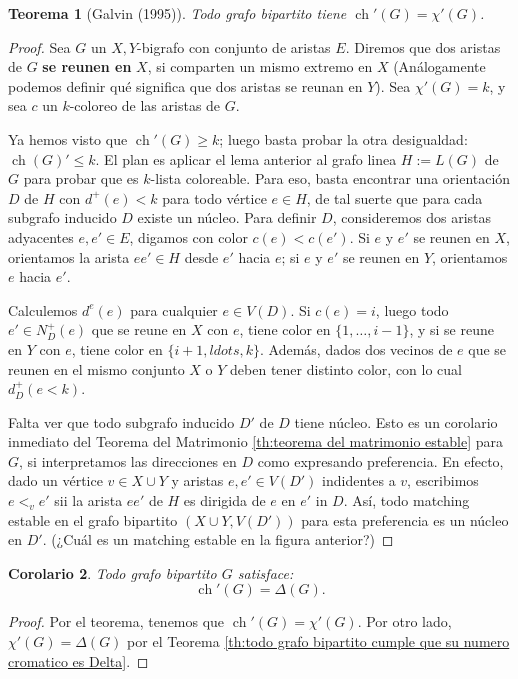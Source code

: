 \documentclass[12pt]{report}
\theoremstyle{plain}
\newtheorem{theorem}{Teorema}[section]
\newtheorem{corollary}[theorem]{Corolario}
\theoremstyle{definition}
\newcommand{\ch}[1]{\operatorname{ch} (#1)}
\begin{document}
\begin{theorem}[Galvin (1995)]
Todo grafo bipartito tiene $\operatorname{ch}' (G) = \chi ' (G)$.
\end{theorem}
\begin{proof}
Sea $G$ un $X,Y$-bigrafo con conjunto de aristas $E$. Diremos que dos aristas de $G$ \textbf{se reunen en} $X$, si comparten un mismo extremo en $X$ (Análogamente podemos definir qué significa que dos aristas se reunan en $Y$). Sea $\chi ' (G) = k$, y sea $c$ un $k$-coloreo de las aristas de $G$.

Ya hemos visto que $\operatorname{ch}' (G) \geq k$; luego basta probar la otra desigualdad: $\ch G ' \leq k$. El plan es aplicar el lema anterior al grafo linea $H:= L(G)$ de $G$ para probar que es $k$-lista coloreable. Para eso, basta encontrar una orientación $D$ de $H$ con $d^+ (e) < k$ para todo vértice $e \in H$, de tal suerte que para cada subgrafo inducido $D$ existe un núcleo. Para definir $D$, consideremos dos aristas adyacentes $e, e' \in E$, digamos con color $c(e) < c(e')$. Si $e$ y $e'$ se reunen en $X$, orientamos la arista $ee' \in H$ desde $e'$ hacia $e$; si $e$ y $e'$ se reunen en $Y$, orientamos $e$ hacia $e'$.


Calculemos $d^e (e)$ para cualquier $ e \in V(D)$. Si $c(e) = i$, luego todo $e' \in N^+_D (e)$ que se reune en $X$ con $e$, tiene color en $\{1, \ldots, i-1\}$, y si se reune en $Y$ con $e$, tiene color en $\{i+1, ldots, k\}$. Además, dados dos vecinos de $e$ que se reunen en el mismo conjunto $X$ o $Y$ deben tener distinto color, con lo cual $d^+_D (e < k)$.

Falta ver que todo subgrafo inducido $D'$ de $D$ tiene núcleo. Esto es un corolario inmediato del Teorema del Matrimonio \ref{th:teorema del matrimonio estable} para $G$, si interpretamos las direcciones en $D$ como expresando preferencia. En efecto, dado un vértice $v \in X \cup Y$ y aristas $e, e' \in V(D')$ indidentes a $v$, escribimos $e <_v e'$ sii la arista $ee'$ de $H$ es dirigida de $e$ en $e'$ in $D$. Así, todo matching estable en el grafo bipartito $(X \cup Y, V(D'))$ para esta preferencia es un núcleo en $D'$. (¿Cuál es un matching estable en la figura anterior?)
\end{proof}

\begin{corollary}
Todo grafo bipartito $G$ satisface:
\[
    \boxed{\operatorname{ch}' (G) = \Delta (G).}
\]
\end{corollary}
\begin{proof}
Por el teorema, tenemos que $\operatorname{ch}' (G) = \chi ' (G)$. Por otro lado, $\chi ' (G) = \Delta (G)$ por el Teorema \ref{th:todo grafo bipartito cumple que su numero cromatico es Delta}.
\end{proof}
\end{document}
